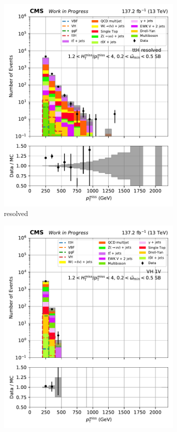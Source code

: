 \begin{figure}[htbp]
\begin{subfigure}[b]{0.24\textwidth}
        \includegraphics[width=\textwidth]{figures/region_plots/2016to18/sideband_1/ttH_resolved.pdf}
        \caption{\ttH resolved}
    \end{subfigure}
    \begin{subfigure}[b]{0.24\textwidth}
        \includegraphics[width=\textwidth]{figures/region_plots/2016to18/sideband_1/VH_1V.pdf}

\end{subfigure}
\end{figure}
